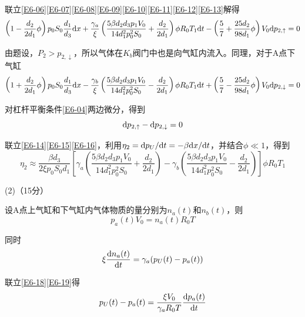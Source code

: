 \documentclass[10pt,a4paper,onecolumn,UTF8]{ctexart}
\begin{document}
	联立\eqref{E6-06}\eqref{E6-07}\eqref{E6-08}\eqref{E6-09}\eqref{E6-10}\eqref{E6-11}\eqref{E6-12}\eqref{E6-13}解得
	\begin{equation}\label{E6-14}
		\left(1-\frac{d_2}{2d_1}\phi\right)p_0S_0\frac{d_1}{d_3}\mathrm{d} x+\frac{\gamma_a}{\xi}\left(\frac{5\beta d_2d_3p_1V_0}{14d_1^2p_0^2S_0}+\frac{d_2}{2d_1}\right)\phi R_0T_1\mathrm{d} t- \left(\frac 5 7+\frac{25d_2}{98d_1}\phi\right)V_0\mathrm{d} p_{2,\uparrow}=0
	\end{equation}
	
	由题设，$P_2>p_{2,\downarrow}$，所以气体在$K_b$阀门中也是向气缸内流入。同理，对于A点下气缸
	\begin{equation}\label{E6-15}
		\left(1+\frac{d_2}{2d_1}\phi\right)p_0S_0\frac{d_1}{d_3}\mathrm{d} x-\frac{\gamma_b}{\xi}\left(\frac{5\beta d_2d_3p_1V_0}{14d_1^2p_0^2S_0}-\frac{d_2}{2d_1}\right)\phi R_0T_1\mathrm{d} t+ \left(\frac 5 7-\frac{25d_2}{98d_1}\phi\right)V_0\mathrm{d} p_{2,\downarrow}=0
	\end{equation}
	
	对杠杆平衡条件\eqref{E6-04}两边微分，得到
	\begin{equation}\label{E6-16}
		\mathrm{d} p_{2,\uparrow}-\mathrm{d} p_{2,\downarrow}=0
	\end{equation}
	
	联立\eqref{E6-14}\eqref{E6-15}\eqref{E6-16}，利用$\eta_2=\mathrm{d} p_U/\mathrm{d} t=-\beta\mathrm{d} x/\mathrm{d} t$，并结合$\phi\ll1$，得到
	\begin{equation}\label{E6-17}
		\eta_2\approx\frac{\beta d_3}{2\xi p_0S_0d_1 }\left[\gamma_a\left(\frac{5\beta d_2d_3p_1V_0}{14d_1^2p_0^2S_0}+\frac{d_2}{2d_1}\right)-\gamma_b\left(\frac{5\beta d_2d_3p_1V_0}{14d_1^2p_0^2S_0}-\frac{d_2}{2d_1}\right)\right]\phi R_0T_1		
	\end{equation}
	
	(2)（15分）
	
	设A点上气缸和下气缸内气体物质的量分别为$n_a(t)$和$n_b(t)$，则
	\begin{equation}\label{E6-18}
		p_a(t)V_0=n_a(t)R_0T
	\end{equation}
	
	同时
	\begin{equation}\label{E6-19}
		\xi\frac{\mathrm{d} n_a(t)}{\mathrm{d} t}=\gamma_a(p_U(t)-p_a(t))
	\end{equation}
	
	联立\eqref{E6-18}\eqref{E6-19}得
	\begin{equation}\label{E6-20}
		p_U(t)-p_a(t)=\frac{\xi V_0}{\gamma_aR_0T}\frac{\mathrm{d} p_a(t)}{\mathrm{d} t}
	\end{equation}
	
\end{document}
